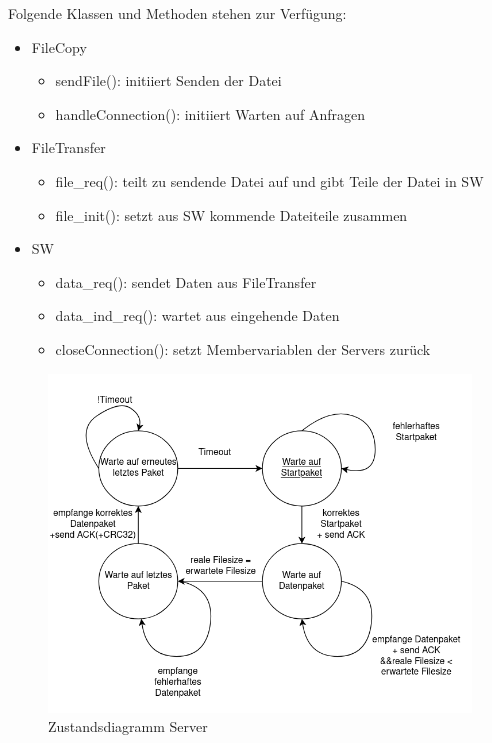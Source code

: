 \documentclass{article}
\begin{document}
\vspace{1em}Folgende Klassen und Methoden stehen zur Verfügung:
\begin{itemize}
    \item FileCopy
    \begin{itemize}
        \item sendFile(): initiiert Senden der Datei
        \item handleConnection(): initiiert Warten auf Anfragen
    \end{itemize}
    \item FileTransfer
    \begin{itemize}
        \item file\_req(): teilt zu sendende Datei auf und gibt Teile der Datei in SW
        \item file\_init(): setzt aus SW kommende Dateiteile zusammen
    \end{itemize}
    \item SW
    \begin{itemize}
        \item data\_req(): sendet Daten aus FileTransfer
        \item data\_ind\_req(): wartet aus eingehende Daten
        \item closeConnection(): setzt Membervariablen der Servers zurück
    \end{itemize}
\end{itemize}

\begin{figure}[H]
    \centering
    \includegraphics[width=0.8\linewidth]{Server_Zustandsdiagramm.png}
    \caption{Zustandsdiagramm Server}
    \label{fig:server}
\end{figure}
\end{document}

